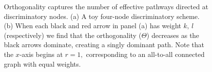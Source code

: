 \begin{figure}[htb]

\resizebox{0.75\columnwidth}{!}{
\subfigure{
}
}
\resizebox{0.76\columnwidth}{!}{
\subfigure{
}
}
\caption{Orthogonality captures the number of effective pathways directed at discriminatory nodes.  (a) A toy four-node discriminatory scheme.  (b) When each black and red arrow in panel (a) has weight $k, \ l$ (respectively) we find that the orthogonality ($\Theta$) decreases as the black arrows dominate, creating a singly dominant path.  Note that the $x$-axis begins at $r=1,$ corresponding to an all-to-all connected graph with equal weights.\label{fig:toy_model}}
\end{figure}


